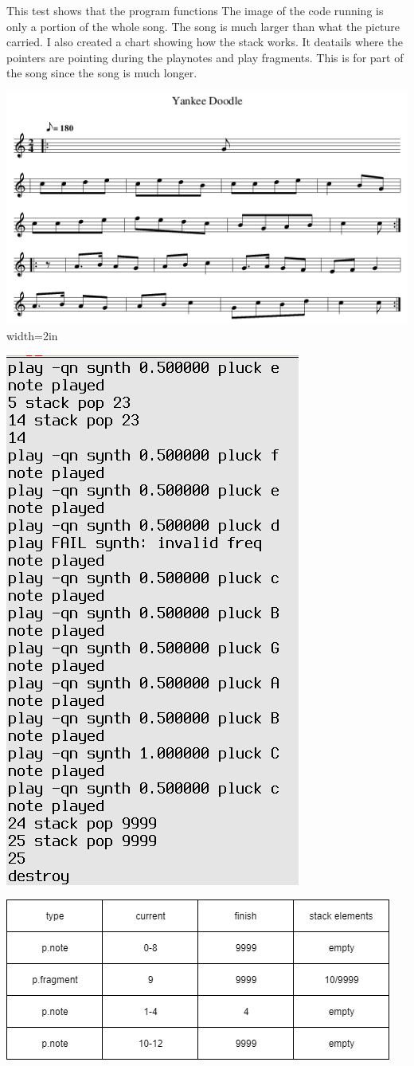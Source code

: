 This test shows that the program functions The image of the code running is only a portion of the whole song. The song is much larger than what the picture carried. I also created a chart showing how the stack works. It deatails where the pointers are pointing during the playnotes and play fragments. This is for part of the song since the song is much longer.

 
\includegraphics{../music.png} width=2in


\includegraphics{../fig.png}

\includegraphics{../chart.png}
 